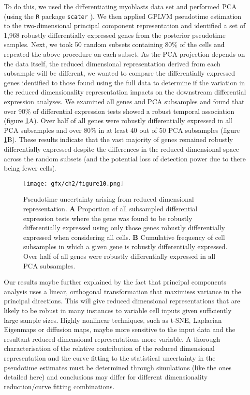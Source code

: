 To do this, we used the differentiating myoblasts data set \cite{Trapnell2014-xi} and performed PCA (using the \texttt{R} package \texttt{scater} \cite{McCarthy2017-we}). We then applied GPLVM pseudotime estimation to the two-dimensional principal component representation and identified a set of 1,968 robustly differentially expressed genes from the posterior pseudotime samples. Next, we took 50 random subsets containing 80\% of the cells and repeated the above procedure on each subset. As the PCA projection depends on the data itself, the reduced dimensional representation derived from each subsample will be different, we wanted to compare the differentially expressed genes identified to those found using the full data to determine if the variation in the reduced dimensionality representation impacts on the downstream differential expression analyses. We examined all genes and PCA subsamples and found that over 90\% of differential expression tests showed a robust temporal association (figure \ref{fig:pca_compare}A). Over half of all genes were robustly differentially expressed in all PCA subsamples and over 80\% in at least 40 out of 50 PCA subsamples (figure \ref{fig:pca_compare}B). These results indicate that the vast majority of genes remained robustly differentially expressed despite the differences in the reduced dimensional space across the random subsets (and the potential loss of detection power due to there being fewer cells).

\begin{figure}
\centering
	\texttt{[image: gfx/ch2/figure10.png]}
\caption[Pseudotime uncertainty arising from reduced dimensional representation.]{ Pseudotime uncertainty arising from reduced dimensional representation.
\textbf{A} Proportion of all subsampled differential expression tests where the gene was found to be robustly differentially expressed using only those genes robustly differentially expressed when considering all cells. %
\textbf{B} Cumulative frequency of cell subsamples in which a given gene is robustly differentially expressed. Over half of all genes were robustly differentially expressed in all PCA subsamples.} \label{fig:pca_compare}
\end{figure}

Our results maybe further explained by the fact that principal components analysis uses a linear, orthogonal transformation that maximises variance in the principal directions. This will give reduced dimensional representations that are likely to be robust in many instances to variable cell inputs given sufficiently large sample sizes. Highly nonlinear techniques, such as t-SNE, Laplacian Eigenmaps or diffusion maps, maybe more sensitive to the input data and the resultant reduced dimensional representations more variable. A thorough characterisation of the relative contribution of the reduced dimensional representation and the curve fitting to the statistical uncertainty in the pseudotime estimates must be determined through simulations (like the ones detailed here) and conclusions may differ for different dimensionality reduction/curve fitting combinations.

